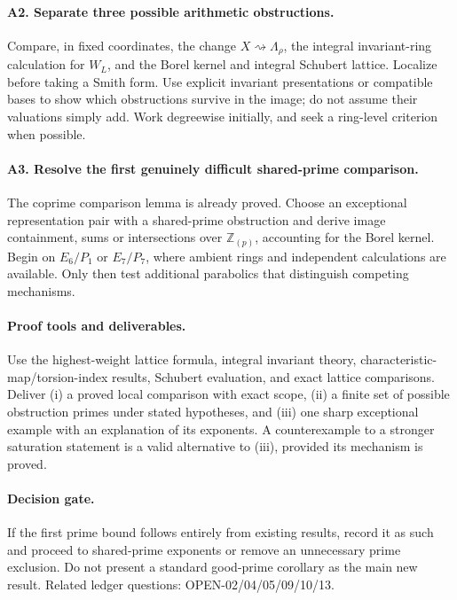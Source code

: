 \documentclass[11pt,letterpaper]{article}
\newcommand{\Z}{\mathbb Z}
\begin{document}
\paragraph{A2. Separate three possible arithmetic obstructions.}
Compare, in fixed coordinates, the change \(X\rightsquigarrow\Lambda_\rho\),
the integral invariant-ring calculation for \(W_L\), and the Borel kernel
and integral Schubert lattice. Localize before taking a Smith form.
Use explicit invariant presentations or compatible bases to show which
obstructions survive in the image; do not assume their valuations simply add.
Work degreewise initially, and seek a ring-level criterion when possible.

\paragraph{A3. Resolve the first genuinely difficult shared-prime comparison.}
The coprime comparison lemma is already proved. Choose an exceptional
representation pair with a shared-prime obstruction and derive image
containment, sums or intersections over \(\Z_{(p)}\), accounting for the
Borel kernel. Begin on \(E_6/P_1\) or \(E_7/P_7\), where ambient rings
and independent calculations are available. Only then test additional
parabolics that distinguish competing mechanisms.

\paragraph{Proof tools and deliverables.}
Use the highest-weight lattice formula, integral invariant theory,
characteristic-map/torsion-index results, Schubert evaluation, and exact
lattice comparisons. Deliver (i) a proved local comparison with exact scope,
(ii) a finite set of possible obstruction primes under stated hypotheses,
and (iii) one sharp exceptional example with an explanation of its exponents.
A counterexample to a stronger saturation statement is a valid alternative
to (iii), provided its mechanism is proved.

\paragraph{Decision gate.}
If the first prime bound follows entirely from existing results, record
it as such and proceed to shared-prime exponents or remove an unnecessary
prime exclusion. Do not present a standard good-prime corollary as the main
new result. Related ledger questions: OPEN-02/04/05/09/10/13.
\end{document}
